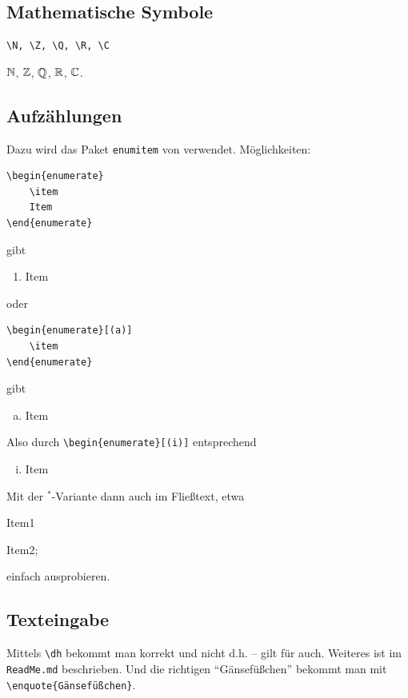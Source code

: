 \begin{refsection}
\subsection*{Mathematische Symbole}
%
\begin{verbatim}
\N, \Z, \Q, \R, \C
\end{verbatim}
$ \mathbb{N} $, $ \mathbb{Z} $, $ \mathbb{Q} $, $ \mathbb{R} $, $ \mathbb{C} $.
\subsection*{Aufzählungen}
Dazu wird das Paket \texttt{enumitem} von \textcite{enumitem} verwendet.
Möglichkeiten:
\begin{verbatim}
\begin{enumerate}
 	\item
	Item
\end{enumerate}
\end{verbatim} 
gibt
\begin{enumerate}
 	\item
	Item
\end{enumerate}
oder
\begin{verbatim}
\begin{enumerate}[(a)]
 	\item
\end{enumerate}
\end{verbatim}
gibt
\begin{enumerate}[(a)]
 	\item
	Item
\end{enumerate}
Also durch \verb|\begin{enumerate}[(i)]| entsprechend
\begin{enumerate}[(i)]
 	\item
	Item
\end{enumerate}
Mit der $^{*}$-Variante dann auch im Fließtext, etwa
\begin{enumerate*}[(a)]
 	\item
	Item1
	\item
	Item2; 
\end{enumerate*}
einfach ausprobieren.
\subsection*{Texteingabe}
Mittels \verb|\dh| bekommt man korrekt \dh und nicht d.h. -- gilt für \ua auch.
Weiteres ist im \texttt{ReadMe.md} beschrieben. 
Und die richtigen \enquote{Gänsefüßchen} bekommt man mit \verb|\enquote{Gänsefüßchen}|.


\end{refsection}

